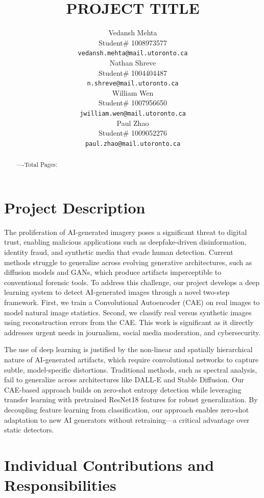 \documentclass{article} %
\title{PROJECT TITLE}
\author{Vedansh Mehta  \\
Student\# 1008973577 \\
\texttt{vedansh.mehta@mail.utoronto.ca} \\
\And
Nathan Shreve  \\
Student\# 1004404487 \\
\texttt{n.shreve@mail.utoronto.ca} \\
\AND
William Wen  \\
Student\# 1007956650 \\
\texttt{jwilliam.wen@mail.utoronto.ca} \\
\And
Paul Zhao \\
Student\# 1009052276 \\
\texttt{paul.zhao@mail.utoronto.ca} \\
\AND
}
\begin{document}
\maketitle

\begin{abstract}
    ----Total Pages: \pageref{last_page}
\end{abstract}



\section{Project Description}

The proliferation of AI-generated imagery poses a significant threat to digital trust, enabling malicious applications such as deepfake-driven disinformation, identity fraud, and synthetic media that evade human detection. Current methods struggle to generalize across evolving generative architectures, such as diffusion models and GANs, which produce artifacts imperceptible to conventional forensic tools. To address this challenge, our project develops a deep learning system to detect AI-generated images through a novel two-step framework. First, we train a Convolutional Autoencoder (CAE) on real images to model natural image statistics. Second, we classify real versus synthetic images using reconstruction errors from the CAE. This work is significant as it directly addresses urgent needs in journalism, social media moderation, and cybersecurity.

The use of deep learning is justified by the non-linear and spatially hierarchical nature of AI-generated artifacts, which require convolutional networks to capture subtle, model-specific distortions. Traditional methods, such as spectral analysis, fail to generalize across architectures like DALL-E and Stable Diffusion. Our CAE-based approach builds on zero-shot entropy detection while leveraging transfer learning with pretrained ResNet18 features for robust generalization. By decoupling feature learning from classification, our approach enables zero-shot adaptation to new AI generators without retraining—a critical advantage over static detectors.

\section{Individual Contributions and Responsibilities}
\end{document}

